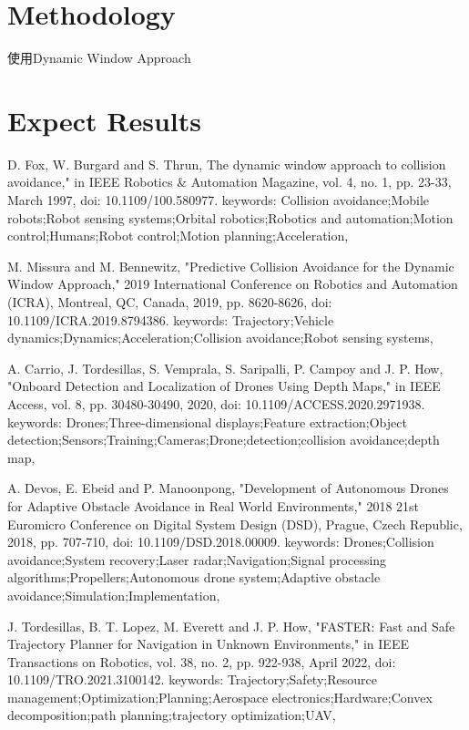 \documentclass[12pt, a4paper, oneside]{article}
\begin{document}
	\section{Methodology}
	使用Dynamic Window Approach
	\section{Expect Results}
	
	
	\begin{thebibliography}{1}
		
		D. Fox, W. Burgard and S. Thrun, The dynamic window approach to collision avoidance," in IEEE Robotics \& Automation Magazine, vol. 4, no. 1, pp. 23-33, March 1997, doi: 10.1109/100.580977. keywords: {Collision avoidance;Mobile robots;Robot sensing systems;Orbital robotics;Robotics and automation;Motion control;Humans;Robot control;Motion planning;Acceleration},
		
		M. Missura and M. Bennewitz, "Predictive Collision Avoidance for the Dynamic Window Approach," 2019 International Conference on Robotics and Automation (ICRA), Montreal, QC, Canada, 2019, pp. 8620-8626, doi: 10.1109/ICRA.2019.8794386.
		keywords: {Trajectory;Vehicle dynamics;Dynamics;Acceleration;Collision avoidance;Robot sensing systems},
		
		A. Carrio, J. Tordesillas, S. Vemprala, S. Saripalli, P. Campoy and J. P. How, "Onboard Detection and Localization of Drones Using Depth Maps," in IEEE Access, vol. 8, pp. 30480-30490, 2020, doi: 10.1109/ACCESS.2020.2971938.
		keywords: {Drones;Three-dimensional displays;Feature extraction;Object detection;Sensors;Training;Cameras;Drone;detection;collision avoidance;depth map},
		
		A. Devos, E. Ebeid and P. Manoonpong, "Development of Autonomous Drones for Adaptive Obstacle Avoidance in Real World Environments," 2018 21st Euromicro Conference on Digital System Design (DSD), Prague, Czech Republic, 2018, pp. 707-710, doi: 10.1109/DSD.2018.00009. keywords: {Drones;Collision avoidance;System recovery;Laser radar;Navigation;Signal processing algorithms;Propellers;Autonomous drone system;Adaptive obstacle avoidance;Simulation;Implementation},
		
		J. Tordesillas, B. T. Lopez, M. Everett and J. P. How, "FASTER: Fast and Safe Trajectory Planner for Navigation in Unknown Environments," in IEEE Transactions on Robotics, vol. 38, no. 2, pp. 922-938, April 2022, doi: 10.1109/TRO.2021.3100142.
		keywords: {Trajectory;Safety;Resource management;Optimization;Planning;Aerospace electronics;Hardware;Convex decomposition;path planning;trajectory optimization;UAV},
		
		
	\end{thebibliography}
	
\end{document}
